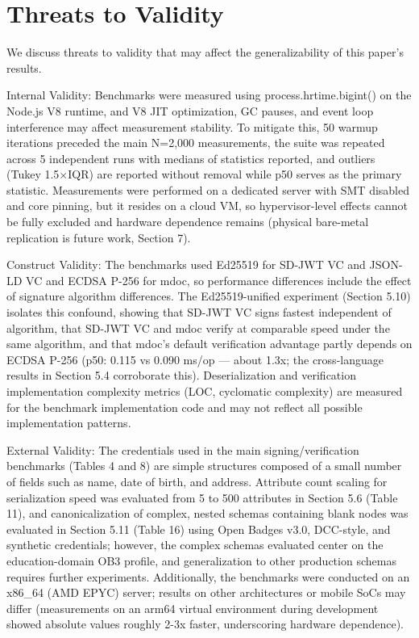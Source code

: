 \documentclass[conference]{IEEEtran}
\begin{document}
\section{Threats to Validity}

We discuss threats to validity that may affect the generalizability of this paper's results.

Internal Validity: Benchmarks were measured using process.hrtime.bigint() on the Node.js V8 runtime, and V8 JIT optimization, GC pauses, and event loop interference may affect measurement stability. To mitigate this, 50 warmup iterations preceded the main N=2,000 measurements, the suite was repeated across 5 independent runs with medians of statistics reported, and outliers (Tukey 1.5$\times$IQR) are reported without removal while p50 serves as the primary statistic. Measurements were performed on a dedicated server with SMT disabled and core pinning, but it resides on a cloud VM, so hypervisor-level effects cannot be fully excluded and hardware dependence remains (physical bare-metal replication is future work, Section 7).

Construct Validity: The benchmarks used Ed25519 for SD-JWT VC and JSON-LD VC and ECDSA P-256 for mdoc, so performance differences include the effect of signature algorithm differences. The Ed25519-unified experiment (Section 5.10) isolates this confound, showing that SD-JWT VC signs fastest independent of algorithm, that SD-JWT VC and mdoc verify at comparable speed under the same algorithm, and that mdoc's default verification advantage partly depends on ECDSA P-256 (p50: 0.115 vs 0.090 ms/op --- about 1.3x; the cross-language results in Section 5.4 corroborate this). Deserialization and verification implementation complexity metrics (LOC, cyclomatic complexity) are measured for the benchmark implementation code and may not reflect all possible implementation patterns.

External Validity: The credentials used in the main signing/verification benchmarks (Tables 4 and 8) are simple structures composed of a small number of fields such as name, date of birth, and address. Attribute count scaling for serialization speed was evaluated from 5 to 500 attributes in Section 5.6 (Table 11), and canonicalization of complex, nested schemas containing blank nodes was evaluated in Section 5.11 (Table 16) using Open Badges v3.0, DCC-style, and synthetic credentials; however, the complex schemas evaluated center on the education-domain OB3 profile, and generalization to other production schemas requires further experiments. Additionally, the benchmarks were conducted on an x86\_64 (AMD EPYC) server; results on other architectures or mobile SoCs may differ (measurements on an arm64 virtual environment during development showed absolute values roughly 2-3x faster, underscoring hardware dependence).
\end{document}
